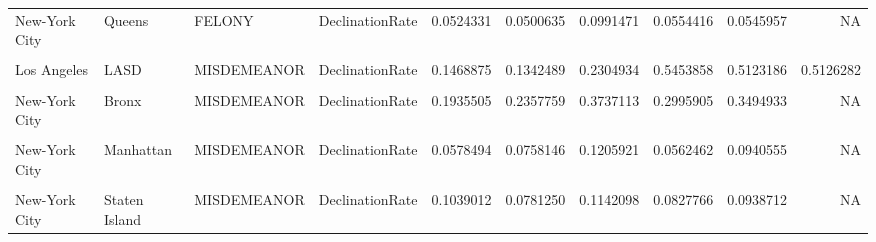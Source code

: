 \documentclass{article}
\begin{document}
\begin{table}[!h]
\begin{tabular}{llllrrrrrr}
New-York City & Queens & FELONY & DeclinationRate & 0.0524331 & 0.0500635 & 0.0991471 & 0.0554416 & 0.0545957 & NA\\
\addlinespace
\cellcolor{gray!6}{New-York City} & \cellcolor{gray!6}{Staten Island} & \cellcolor{gray!6}{FELONY} & \cellcolor{gray!6}{DeclinationRate} & \cellcolor{gray!6}{0.0491568} & \cellcolor{gray!6}{0.0477490} & \cellcolor{gray!6}{0.0824742} & \cellcolor{gray!6}{0.0278510} & \cellcolor{gray!6}{0.0513940} & \cellcolor{gray!6}{NA}\\
Los Angeles & LASD & MISDEMEANOR & DeclinationRate & 0.1468875 & 0.1342489 & 0.2304934 & 0.5453858 & 0.5123186 & 0.5126282\\
\cellcolor{gray!6}{Los Angeles} & \cellcolor{gray!6}{LAPD} & \cellcolor{gray!6}{MISDEMEANOR} & \cellcolor{gray!6}{DeclinationRate} & \cellcolor{gray!6}{0.2332885} & \cellcolor{gray!6}{0.1980694} & \cellcolor{gray!6}{0.2203486} & \cellcolor{gray!6}{0.2830114} & \cellcolor{gray!6}{0.3335998} & \cellcolor{gray!6}{0.3728609}\\
New-York City & Bronx & MISDEMEANOR & DeclinationRate & 0.1935505 & 0.2357759 & 0.3737113 & 0.2995905 & 0.3494933 & NA\\
\cellcolor{gray!6}{New-York City} & \cellcolor{gray!6}{Brooklyn} & \cellcolor{gray!6}{MISDEMEANOR} & \cellcolor{gray!6}{DeclinationRate} & \cellcolor{gray!6}{0.0894568} & \cellcolor{gray!6}{0.1143214} & \cellcolor{gray!6}{0.2092692} & \cellcolor{gray!6}{0.1220284} & \cellcolor{gray!6}{0.1493989} & \cellcolor{gray!6}{NA}\\
\addlinespace
New-York City & Manhattan & MISDEMEANOR & DeclinationRate & 0.0578494 & 0.0758146 & 0.1205921 & 0.0562462 & 0.0940555 & NA\\
\cellcolor{gray!6}{New-York City} & \cellcolor{gray!6}{Queens} & \cellcolor{gray!6}{MISDEMEANOR} & \cellcolor{gray!6}{DeclinationRate} & \cellcolor{gray!6}{0.0274341} & \cellcolor{gray!6}{0.0344504} & \cellcolor{gray!6}{0.0796932} & \cellcolor{gray!6}{0.0470601} & \cellcolor{gray!6}{0.0414089} & \cellcolor{gray!6}{NA}\\
New-York City & Staten Island & MISDEMEANOR & DeclinationRate & 0.1039012 & 0.0781250 & 0.1142098 & 0.0827766 & 0.0938712 & NA\\
\bottomrule
\end{tabular}
\end{table}
\end{document}
